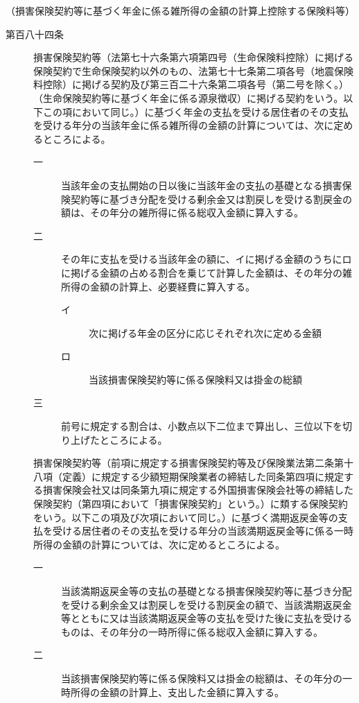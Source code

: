 \documentclass[twocolumn,a4j,10pt]{ltjtarticle}
\begin{document}
\noindent\hspace{10pt}（損害保険契約等に基づく年金に係る雑所得の金額の計算上控除する保険料等）
\begin{description}
\item[第百八十四条]損害保険契約等（法第七十六条第六項第四号（生命保険料控除）に掲げる保険契約で生命保険契約以外のもの、法第七十七条第二項各号（地震保険料控除）に掲げる契約及び第三百二十六条第二項各号（第二号を除く。）（生命保険契約等に基づく年金に係る源泉徴収）に掲げる契約をいう。以下この項において同じ。）に基づく年金の支払を受ける居住者のその支払を受ける年分の当該年金に係る雑所得の金額の計算については、次に定めるところによる。
\begin{description}
\item[一]当該年金の支払開始の日以後に当該年金の支払の基礎となる損害保険契約等に基づき分配を受ける剰余金又は割戻しを受ける割戻金の額は、その年分の雑所得に係る総収入金額に算入する。
\item[二]その年に支払を受ける当該年金の額に、イに掲げる金額のうちにロに掲げる金額の占める割合を乗じて計算した金額は、その年分の雑所得の金額の計算上、必要経費に算入する。
\begin{description}
\item[イ]次に掲げる年金の区分に応じそれぞれ次に定める金額
\item[ロ]当該損害保険契約等に係る保険料又は掛金の総額
\end{description}
\item[三]前号に規定する割合は、小数点以下二位まで算出し、三位以下を切り上げたところによる。
\end{description}
\item[]損害保険契約等（前項に規定する損害保険契約等及び保険業法第二条第十八項（定義）に規定する少額短期保険業者の締結した同条第四項に規定する損害保険会社又は同条第九項に規定する外国損害保険会社等の締結した保険契約（第四項において「損害保険契約」という。）に類する保険契約をいう。以下この項及び次項において同じ。）に基づく満期返戻金等の支払を受ける居住者のその支払を受ける年分の当該満期返戻金等に係る一時所得の金額の計算については、次に定めるところによる。
\begin{description}
\item[一]当該満期返戻金等の支払の基礎となる損害保険契約等に基づき分配を受ける剰余金又は割戻しを受ける割戻金の額で、当該満期返戻金等とともに又は当該満期返戻金等の支払を受けた後に支払を受けるものは、その年分の一時所得に係る総収入金額に算入する。
\item[二]当該損害保険契約等に係る保険料又は掛金の総額は、その年分の一時所得の金額の計算上、支出した金額に算入する。

\end{description}
\end{description}
\end{document}
